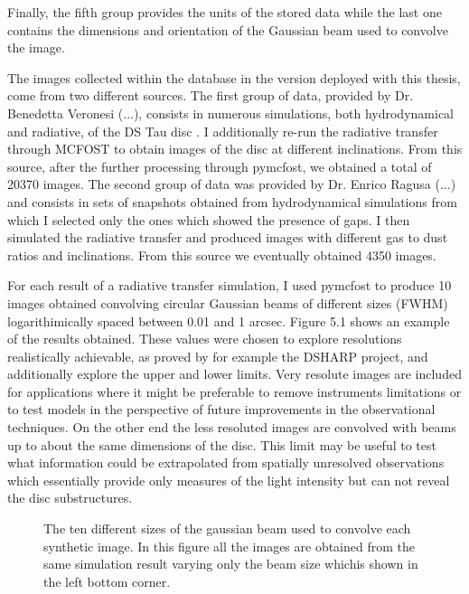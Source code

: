 \documentclass[a4paper,10pt]{report}
\begin{document}
Finally, the fifth group provides the units of the stored data while the last one contains
the dimensions and orientation of the Gaussian beam used to convolve the image.

The images collected within the database in the version deployed with this thesis, come from two different sources.
The first group of data, provided by Dr. Benedetta Veronesi (...), consists in numerous simulations,
both hydrodynamical and radiative,
of the DS Tau disc \cite{dstauv}. 
I additionally re-run the radiative transfer through MCFOST to obtain images of the disc at different inclinations.
From this source, after the further processing through pymcfost, we obtained a total of 20370 images.
The second group of data was provided by Dr. Enrico Ragusa (...) and consists in sets of snapshots
obtained from hydrodynamical simulations from which I selected only the ones which showed the presence of gaps.
I then simulated the radiative transfer and produced images with different gas to dust ratios and inclinations.
From this source we eventually obtained 4350 images.

For each result of a radiative transfer simulation, I used pymcfost to produce 10 images obtained convolving circular 
Gaussian beams of different sizes (FWHM)
logarithimically spaced between 0.01 and 1 arcsec. Figure 5.1 shows an example of the results obtained.
These values were chosen to explore resolutions
realistically achievable, as proved by for example the DSHARP project, and additionally explore the upper and lower limits.
Very resolute images are included for applications where it might be preferable to remove instruments limitations
or to test models in the perspective of future improvements in the observational techniques. 
On the other end the less resoluted images are convolved with beams up to about the same dimensions of the disc. 
This limit may be useful to test what information could be extrapolated from spatially unresolved observations
which essentially provide only measures of the light intensity but can not reveal the disc substructures.

\begin{figure}
    \begin{center}
        \scalebox{0.4}{}
    \end{center}
    \caption{The ten different sizes of the gaussian beam used to convolve each synthetic image. 
    In this figure all the images are obtained from the same simulation result varying only the
    beam size whichis shown in the left bottom corner.}
\end{figure}
\end{document}
